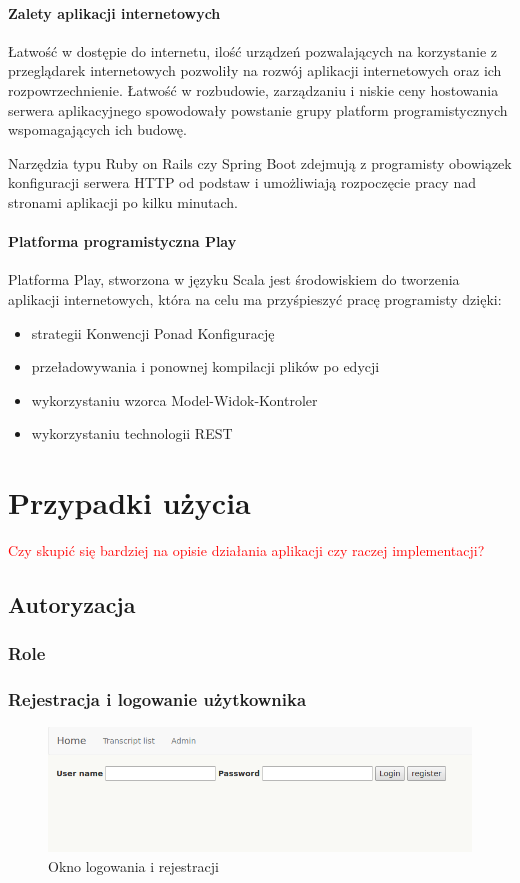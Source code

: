 \documentclass[a4paper,12pt,twoside]{article}
\begin{document}
\paragraph{Zalety aplikacji internetowych}
Łatwość w dostępie do internetu, ilość urządzeń pozwalających na 
korzystanie z przeglądarek internetowych pozwoliły 
na rozwój aplikacji internetowych oraz ich rozpowrzechnienie.
Łatwość w rozbudowie, zarządzaniu i 
niskie ceny hostowania serwera aplikacyjnego spowodowały 
powstanie grupy platform programistycznych wspomagających ich budowę. 

Narzędzia typu Ruby on Rails czy Spring Boot 
zdejmują z programisty obowiązek konfiguracji serwera 
HTTP od podstaw i umożliwiają rozpoczęcie pracy  
nad stronami aplikacji po kilku minutach.

\paragraph{Platforma programistyczna Play}
Platforma Play, stworzona w języku Scala jest środowiskiem 
do tworzenia aplikacji internetowych, 
która na celu ma przyśpieszyć pracę programisty dzięki:
\begin{itemize}
\item strategii Konwencji Ponad Konfigurację
\item przeładowywania i ponownej kompilacji plików po edycji
\item wykorzystaniu wzorca Model-Widok-Kontroler
\item wykorzystaniu technologii REST
\end{itemize} 
  
\newpage
\section{Przypadki użycia}

\textcolor{red}{Czy skupić się bardziej na opisie działania aplikacji czy raczej implementacji?}

\subsection{Autoryzacja}
\subsubsection{Role}
\subsubsection{Rejestracja i logowanie użytkownika}
\begin{figure}[h!]
  \includegraphics[width=\linewidth]{obrazy/aplikacja/login.png}
  \caption{Okno logowania i rejestracji}
  \label{fig:loginpic}
\end{figure}
\end{document}
